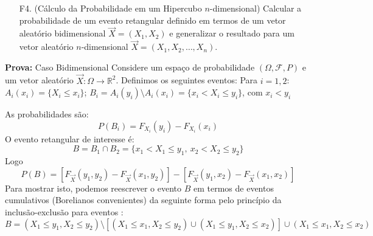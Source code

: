 \begin{frame}
	\begin{block}{}
		\begin{enumerate}	
			\item[F4.](Cálculo da Probabilidade em um Hipercubo $n$-dimensional)	
		Calcular a probabilidade de um evento retangular definido em termos de um vetor aleatório bidimensional \( \vec{X} = (X_1, X_2) \) e generalizar o resultado para um vetor aleatório \( n \)-dimensional \( \vec{X} = (X_1, X_2, \ldots, X_n) \).
%			

			
\end{enumerate}
\end{block}
{\bf Prova:} Caso Bidimensional
Considere um espaço de probabilidade \( (\Omega, \mathcal{F}, P) \) e um vetor aleatório \( \vec{X} : \Omega \rightarrow \mathbb{R}^2 \). Definimos os seguintes eventos: Para \( i = 1, 2 \): \( A_i(x_i) = \{ X_i \leq x_i \} \); \( B_i = A_i(y_i) \setminus A_i(x_i) = \{ x_i < X_i \leq y_i \} \), com \( x_i < y_i \)

As probabilidades são:
\[
P(B_i) = F_{X_i}(y_i) - F_{X_i}(x_i)
\]
O evento retangular de interesse é:
\[
B = B_1 \cap B_2 = \{ x_1 < X_1 \leq y_1, \ x_2 < X_2 \leq y_2 \}
\]
Logo
\[
P(B) = [F_{\vec{X}}(y_1, y_2) - F_{\vec{X}}(x_1, y_2)] - [F_{\vec{X}}(y_1, x_2) - F_{\vec{X}}(x_1, x_2)]
\]
Para mostrar isto, 	podemos reescrever o evento \( B \) em termos de eventos cumulativos (Borelianos convenientes) da seguinte forma pelo princípio da inclusão-exclusão para eventos :
\[
B = (X_1 \leq y_1, X_2 \leq y_2) \setminus [(X_1 \leq x_1, X_2 \leq y_2) \cup (X_1 \leq y_1, X_2 \leq x_2)] \cup (X_1 \leq x_1, X_2 \leq x_2)
\]
\end{frame}		

